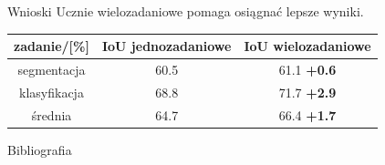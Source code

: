 \documentclass[10pt]{beamer}
\begin{document}
\begin{frame}{Wnioski}
    Ucznie wielozadaniowe pomaga osiągnać lepsze wyniki.
    \begin{table}[]
        \begin{tabular}{c|cc}
        zadanie/{[}\%{]} & IoU jednozadaniowe & IoU wielozadaniowe \\ \hline
        segmentacja      & 60.5               & 61.1  \footnotesize{\textbf{+0.6}}        \\
        klasyfikacja     & 68.8               & 71.7  \footnotesize{\textbf{+2.9 }}        \\ \hline
        średnia          & 64.7               & 66.4  \footnotesize{\textbf{+1.7 }}       
        \end{tabular}
        \end{table}
    
\end{frame}
\begin{frame}{Bibliografia}
    
    
    
    
\end{frame}
\end{document}
